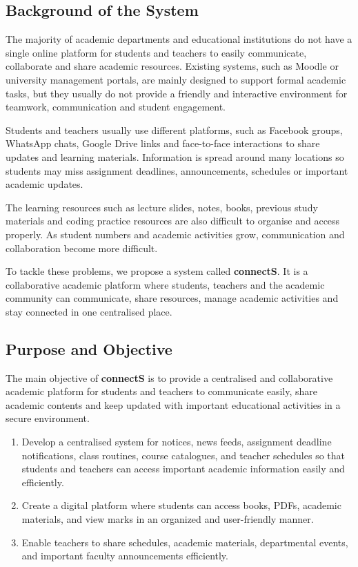 \documentclass[12pt,a4paper]{article}
\begin{document}
\subsection{Background of the System}

The majority of academic departments and educational institutions do not have a single online platform for students and teachers to easily communicate, collaborate and share academic resources. Existing systems, such as Moodle or university management portals, are mainly designed to support formal academic tasks, but they usually do not provide a friendly and interactive environment for teamwork, communication and student engagement.

Students and teachers usually use different platforms, such as Facebook groups, WhatsApp chats, Google Drive links and face-to-face interactions to share updates and learning materials. Information is spread around many locations so students may miss assignment deadlines, announcements, schedules or important academic updates.

The learning resources such as lecture slides, notes, books, previous study materials and coding practice resources are also difficult to organise and access properly. As student numbers and academic activities grow, communication and collaboration become more difficult.

To tackle these problems, we propose a system called \textbf{connectS}. It is a collaborative academic platform where students, teachers and the academic community can communicate, share resources, manage academic activities and stay connected in one centralised place.

\newpage
\subsection{Purpose and Objective}

The main objective of \textbf{connectS} is to provide a centralised and collaborative academic platform for students and teachers to communicate easily, share academic contents and keep updated with important educational activities in a secure environment.

\begin{enumerate}[leftmargin=*, label=\textbf{\arabic*.}]
\item Develop a centralised system for notices, news feeds, assignment deadline notifications, class routines, course catalogues, and teacher schedules so that students and teachers can access important academic information easily and efficiently.
\item Create a digital platform where students can access books, PDFs, academic materials, and view marks in an organized and user-friendly manner.
\item Enable teachers to share schedules, academic materials, departmental events, and important faculty announcements efficiently.
\end{enumerate}
\end{document}

